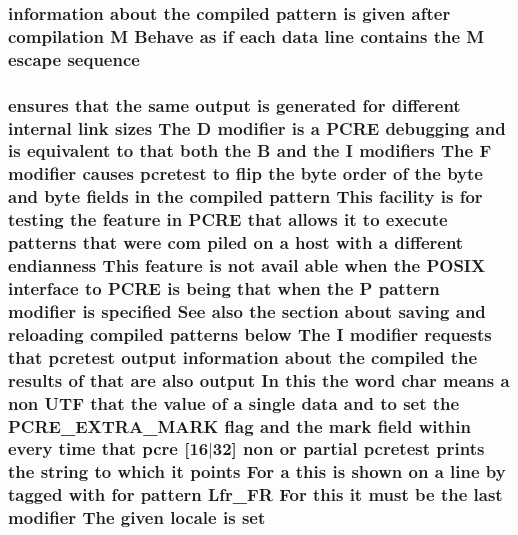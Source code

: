 \subsubsection[{\texorpdfstring{sequence}{sequence}}]{\setlength{\rightskip}{0pt plus 5cm}information about the {\bf compiled} {\bf pattern} {\bf is} {\bf given} {\bf after} {\bf compilation} {\bf M} Behave {\bf as} {\bf if} each {\bf data} {\bf line} {\bf contains} the {\bf M} escape sequence}\hypertarget{pcretest_8txt_a425c3461233dbde8c3de1e66ee1a0676}{}\label{pcretest_8txt_a425c3461233dbde8c3de1e66ee1a0676}
\subsubsection[{\texorpdfstring{set}{set}}]{ ensures that the same {\bf output} {\bf is} {\bf generated} for different internal link sizes The {\bf D} {\bf modifier} {\bf is} {\bf a} {\bf P\+C\+RE} debugging and {\bf is} equivalent {\bf to} that both the {\bf B} and the {\bf I} {\bf modifiers} The {\bf F} {\bf modifier} causes {\bf pcretest} {\bf to} flip the byte {\bf order} {\bf of} the byte and byte {\bf fields} {\bf in} the {\bf compiled} {\bf pattern} This {\bf facility} {\bf is} for testing the {\bf feature} {\bf in} {\bf P\+C\+RE} that allows {\bf it} {\bf to} execute {\bf patterns} that were com piled {\bf on} {\bf a} {\bf host} {\bf with} {\bf a} different endianness This {\bf feature} {\bf is} {\bf not} avail {\bf able} when the P\+O\+S\+IX interface {\bf to} {\bf P\+C\+RE} {\bf is} being that when the P {\bf pattern} {\bf modifier} {\bf is} {\bf specified} See also the {\bf section} about saving and reloading {\bf compiled} {\bf patterns} {\bf below} The {\bf I} {\bf modifier} {\bf requests} that {\bf pcretest} {\bf output} information about the {\bf compiled} the {\bf results} {\bf of} that {\bf are} also {\bf output} In {\bf this} the {\bf word} char means {\bf a} non U\+TF that the {\bf value} {\bf of} {\bf a} single {\bf data} and {\bf to} set the {\bf P\+C\+R\+E\+\_\+\+E\+X\+T\+R\+A\+\_\+\+M\+A\+RK} {\bf flag} and the {\bf mark} {\bf field} within every {\bf time} that {\bf pcre} \mbox{[}16$\vert$32\mbox{]} non {\bf or} {\bf partial} {\bf pcretest} prints the {\bf string} {\bf to} {\bf which} {\bf it} points For {\bf a} {\bf this} {\bf is} shown {\bf on} {\bf a} {\bf line} by tagged {\bf with} for {\bf pattern} Lfr\+\_\+\+FR For {\bf this} {\bf it} must {\bf be} the {\bf last} {\bf modifier} The {\bf given} {\bf locale} {\bf is} set}\hypertarget{pcretest_8txt_add97925460a9dac047a89c41aec5c6a8}{}\label{pcretest_8txt_add97925460a9dac047a89c41aec5c6a8}
